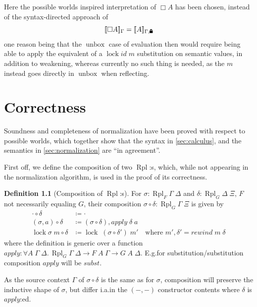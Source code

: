 \documentclass[12pt,twoside,openright]{report}
\numberwithin{equation}{chapter}
\numberwithin{figure}{chapter}
\numberwithin{table}{chapter}
\theoremstyle{definition}\newtheorem{definition}{Definition}
\newcommand{\lock}{\text{\tikz[baseline]{
      \fill[rounded corners=.1ex] (-.75ex,0) rectangle (.75ex,1ex);
      \draw[line width=.3ex] (-.4ex,.5ex) -- ++(0,.75ex) arc (180:0:.4ex) -- ++(0,-.75ex);
}}}
\DeclareMathOperator\unbox{unbox}
\begin{document}
Here the possible worlds inspired interpretation of $\Box A$ has been chosen,
instead of the syntax-directed approach of
$$ \llbracket \Box A \rrbracket_\Gamma = \llbracket A \rrbracket_{\Gamma, \lock} $$
one reason being that the $\unbox$ case of evaluation then would require
being able to apply the equivalent of a $\operatorname{lock} \textit{id} \; m$ substitution
on semantic values, in addition to weakening,
whereas currently no such thing is needed,
as the $m$ instead goes directly in $\unbox$ when reflecting.

\chapter{Correctness}\label{sec:correctness}

Soundness and completeness of normalization
have been proved with respect to possible worlds,
which together show that the syntax in \autoref{sec:calculus},
and the semantics in \autoref{sec:normalization}
are ``in agreement''.

First off, we define the composition of two $\operatorname{Rpl}$:s, which,
while not appearing in the normalization algorithm,
is used in the proof of its correctness.
\begin{definition}[Composition of $\operatorname{Rpl}$:s]\label{def:composition}
  For $\sigma : \operatorname{Rpl}_F \Gamma \; \Delta$
  and $\delta : \operatorname{Rpl}_G \Delta \; \Xi$,
  $F$ not necessarily equaling $G$,
  their composition $\sigma \circ \delta : \operatorname{Rpl}_G \Gamma \; \Xi$
  is given by
  \begin{align*}
    \cdot \circ \delta &\coloneqq \cdot \\
    (\sigma , a) \circ \delta &\coloneqq (\sigma \circ \delta) , \textit{apply} \; \delta \; a \\
    \operatorname{lock} \sigma \; m \circ \delta &\coloneqq \operatorname{lock} \; (\sigma \circ \delta') \; m'
    \quad \text{where } m' , \delta' = \textit{rewind} \; m \; \delta
  \end{align*}
  where the definition is generic over a function
  $\textit{apply} : \forall A \; \Gamma \; \Delta.\, \operatorname{Rpl}_G \Gamma \; \Delta \to F \; A \; \Gamma \to G \; A \; \Delta$.
  E.g.\@ for substitution/substitution composition
  $\textit{apply}$ will be $\textit{subst}$.
\end{definition}
As the source context $\Gamma$ of $\sigma \circ \delta$ is the same as for $\sigma$,
composition will preserve the inductive shape of $\sigma$,
but differ i.a.\@ in the $(-,-)$ constructor contents
where $\delta$ is $\textit{apply}$:ed.
\end{document}
